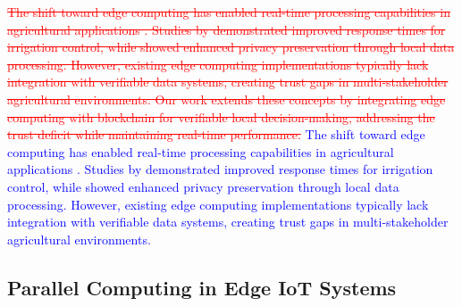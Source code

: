 \documentclass[pdflatex,sn-mathphys-num]{sn-jnl}
\theoremstyle{thmstyleone}
\theoremstyle{thmstyletwo}
\theoremstyle{thmstylethree}
\begin{document}
{\textcolor{red}{\sout{The shift toward edge computing has enabled real-time processing capabilities in agricultural applications . Studies by demonstrated improved response times for irrigation control, while showed enhanced privacy preservation through local data processing. However, existing edge computing implementations typically lack integration with verifiable data systems, creating trust gaps in multi-stakeholder agricultural environments. Our work extends these concepts by integrating edge computing with blockchain for verifiable local decision-making, addressing the trust deficit while maintaining real-time performance.}}
\textcolor{blue}{The shift toward edge computing has enabled real-time processing capabilities in agricultural applications \cite{sharma2020edge}. Studies by \cite{liu2019edge} demonstrated improved response times for irrigation control, while \cite{wang2021edge} showed enhanced privacy preservation through local data processing. However, existing edge computing implementations typically lack integration with verifiable data systems, creating trust gaps in multi-stakeholder agricultural environments.}

\subsection{Parallel Computing in Edge IoT Systems}
\label{subsec:parallel_edge}

}
\end{document}
